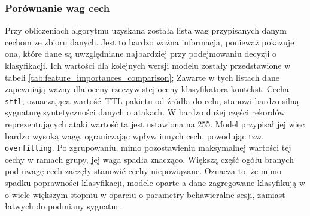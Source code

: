 \documentclass[12pt,twoside]{article}
\begin{document}
\subsubsection{Porównanie wag cech}

Przy obliczeniach algorytmu uzyskana została lista wag przypisanych danym cechom ze zbioru danych.
Jest to bardzo ważna informacja, ponieważ pokazuje ona, które dane są uwzględniane najbardziej przy podejmowaniu decyzji o klasyfikacji.
Ich wartości dla kolejnych wersji modelu zostały przedstawione w tabeli \ref{tab:feature_importances_comparison};
Zawarte w tych listach dane zapewniają ważny dla oceny rzeczywistej oceny klasyfikatora kontekst.
Cecha \texttt{sttl}, oznaczająca wartość TTL pakietu od źródła do celu, stanowi bardzo silną sygnaturę syntetyczności danych o atakach.
W bardzo dużej części rekordów reprezentujących ataki wartość ta jest ustawiona na 255.
Model przypisał jej więc bardzo wysoką wagę, ograniczając wpływ innych cech, powodując tzw. \texttt{overfitting}.
Po zgrupowaniu, mimo pozostawieniu maksymalnej wartości tej cechy w ramach grupy, jej waga spadła znacząco.
Większą część ogółu branych pod uwagę cech zaczęły stanowić cechy niepowiązane.
Oznacza to, że mimo spadku poprawności klasyfikacji, modele oparte a dane zagregowane klasyfikują w o wiele większym stopniu w oparciu o parametry behawieralne sesji, zamiast łatwych do podmiany sygnatur. 
\end{document}
